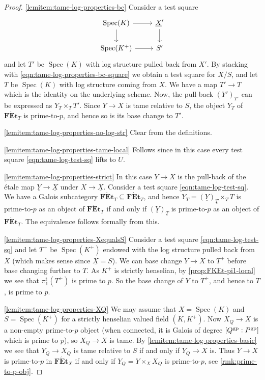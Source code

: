 \documentclass[a4paper,twoside,11pt,reqno]{amsart}
\DeclareMathOperator{\Spec}{Spec}
\newcommand{\cat}[1]{\mathbf{#1}}
\newcommand{\FEt}{\cat{F\acute{E}t}}
\newcommand{\pitame}{\pi_1^{\mathrm{t}}}
\theoremstyle{definition}
\numberwithin{equation}{subsection}
\begin{document}
\begin{proof}
\ref{lemitem:tame-log-properties-bc} 
Consider a test square 
    \[
        \begin{tikzcd}
            \Spec(K)\ar[r] \ar[d] & \underline{X}'\ar[d] \\
            \Spec(K^+) \ar[r] & S'
        \end{tikzcd}
    \]
and let $T'$ be $\Spec(K)$ with log structure pulled back from $X'$. By stacking with \eqref{eqn:tame-log-properties-bc-square} we obtain a test square for $X/S$, and let $T$ be $\Spec(K)$ with log structure coming from $X$. We have a map $T'\to T$ which is the identity on the underlying scheme. Now, the pull-back $(Y')_{T'}$ can be expressed as $Y_T\times_T T'$. Since $Y\to X$ is tame relative to $S$, the object $Y_T$ of $\FEt_T$ is prime-to-$p$, and hence so is its base change to $T'$.

\ref{lemitem:tame-log-properties-no-log-str} 
Clear from the definitions.

\ref{lemitem:tame-log-properties-tame-local} 
Follows since in this case 
every test square \eqref{eqn:tame-log-test-sq} lifts to $U$.

\ref{lemitem:tame-log-properties-strict} 
In this case $Y\to X$ is the pull-back of the \'etale map $\underline{Y}\to\underline{X}$ under $X\to\underline{X}$. Consider a test square \eqref{eqn:tame-log-test-sq}. We have a Galois subcategory $\FEt_{\underline{T}}\subseteq \FEt_T$, and hence $Y_T = (\underline{Y})_{\underline T}\times_{\underline{T}} T$ is prime-to-$p$ as an object of $\FEt_T$ if and only if $(\underline{Y})_{\underline T}$ is prime-to-$p$ as an object of $\FEt_{\underline{T}}$. The equivalence follows formally from this.  

\ref{lemitem:tame-log-properties-XequalsS} 
Consider a test square \eqref{eqn:tame-log-test-sq} and let $T^+$ be $\Spec(K^+)$ endowed with the log structure pulled back from $X$ (which makes sense since $\underline{X}=S$). We can base change $Y\to X$ to $T^+$ before base changing further to $T$. As $K^+$ is strictly henselian, by \cref{prop:FKEt-pi1-local} we see that $\pitame(T^+)$ is prime to $p$. So the base change of $Y$ to $T^+$, and hence to $T$, is prime to $p$.

\ref{lemitem:tame-log-properties-XQ} We may assume that $X=\Spec(K)$ and $S=\Spec(K^+)$ for a strictly henselian valued field $(K,K^+)$.
Now $X_Q\to X$ is a non-empty prime-to-$p$ object (when connected, it is Galois of degree $[Q^{\rm gp}:P^{\rm gp}]$ which is prime to $p$), so $X_Q\to X$ is tame.
By \ref{lemitem:tame-log-properties-basic} we see that $Y_Q\to X_Q$ is tame relative to $S$ if and only if $Y_Q\to X$ is.  Thus $Y\to X$ is prime-to-$p$ in $\FEt_X$ if and only if $Y_Q = Y \times_X X_Q$ is prime-to-$p$, see  \cref{rmk:prime-to-p-obj}.
\end{proof}
\end{document}
